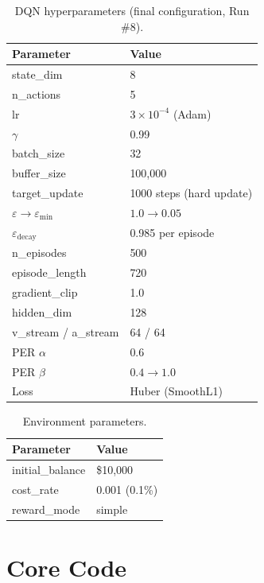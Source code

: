\documentclass[11pt,a4paper]{article}
\begin{document}
\begin{table}[H]
\centering
\caption{DQN hyperparameters (final configuration, Run \#8).}
\begin{tabular}{ll}
\toprule
Parameter & Value \\
\midrule
state\_dim          & 8 \\
n\_actions           & 5 \\
lr                   & $3\times10^{-4}$ (Adam) \\
$\gamma$             & 0.99 \\
batch\_size          & 32 \\
buffer\_size         & 100,000 \\
target\_update       & 1000 steps (hard update) \\
$\varepsilon \to \varepsilon_{\min}$ & $1.0 \to 0.05$ \\
$\varepsilon_{\text{decay}}$ & 0.985 per episode \\
n\_episodes          & 500 \\
episode\_length      & 720 \\
gradient\_clip       & 1.0 \\
hidden\_dim          & 128 \\
v\_stream / a\_stream & 64 / 64 \\
PER $\alpha$         & 0.6 \\
PER $\beta$          & $0.4 \to 1.0$ \\
Loss                 & Huber (SmoothL1) \\
\bottomrule
\end{tabular}
\end{table}

\begin{table}[H]
\centering
\caption{Environment parameters.}
\begin{tabular}{ll}
\toprule
Parameter & Value \\
\midrule
initial\_balance & \$10,000 \\
cost\_rate       & 0.001 (0.1\%) \\
reward\_mode     & simple \\
\bottomrule
\end{tabular}
\end{table}

\section{Core Code}
\end{document}
